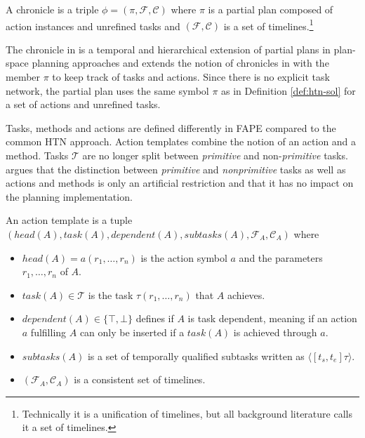 \begin{definition}[Chronicle]
  A chronicle is a triple $\phi = (\pi,\mathcal{F},\mathcal{C})$ where $\pi$ is a partial plan composed of action instances and unrefined tasks and $(\mathcal{F},\mathcal{C})$ is a set of timelines.\footnote{Technically it is a unification of timelines, but all background literature calls it a set of timelines.}
\end{definition}
The chronicle in \cite{bit-monnotFAPEConstraintbasedPlanner2020} is a temporal and hierarchical extension of partial plans in plan-space planning approaches \citep[chap.~5]{ghallabAutomatedPlanningTheory2004} and extends the notion of chronicles in \cite[sec.~4.2.4]{ghallabAutomatedPlanningActing2016} with the member $\pi$ to keep track of tasks and actions.
Since there is no explicit task network, the partial plan uses the same symbol $\pi$ as in Definition \ref{def:htn-sol} for a set of actions and unrefined tasks.



Tasks, methods and actions are defined differently in \ac{FAPE} compared to the common \ac{HTN} approach.
Action templates combine the notion of an action and a method.
Tasks $\mathcal{T}$ are no longer split between \textit{primitive} and non-\textit{primitive} tasks.
\cite{bit-monnotTemporalHierarchicalModels2016a} argues that the distinction between \textit{primitive} and \textit{nonprimitive} tasks as well as actions and methods is only an artificial restriction and that it has no impact on the planning implementation.

\begin{definition}
  An action template is a tuple \\ $(head(A), task(A), dependent(A), subtasks(A), \mathcal{F}_A, \mathcal{C}_A)$ where
  \begin{itemize}
    \item $head(A) = a(r_1,\dots,r_n)$ is the action symbol $a$ and the parameters $r_1,\dots,r_n$ of $A$.
    \item $task(A) \in \mathcal{T}$ is the task $\tau(r_1,\dots,r_n)$ that $A$ achieves.
    \item $dependent(A) \in \{\top,\bot\}$ defines if $A$ is task dependent, meaning if an action $a$ fulfilling $A$ can only be inserted if a $task(A)$ is achieved through $a$.
    \item $subtasks(A)$ is a set of temporally qualified subtasks written as $\langle[t_s,t_e] \tau\rangle$.
    \item $(\mathcal{F}_A, \mathcal{C}_A)$ is a consistent set of timelines.
  \end{itemize}
\end{definition}

